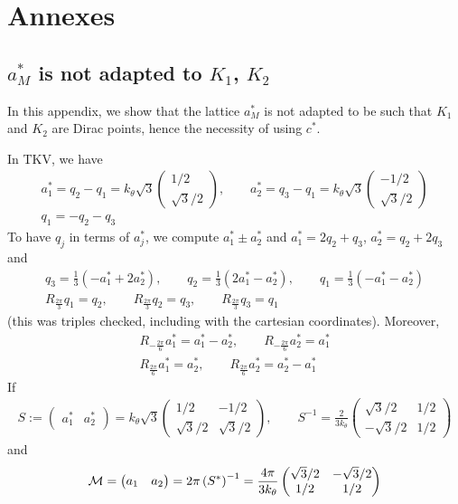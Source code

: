 \documentclass[11pt,a4paper,reqno,french,tikz]{amsart}
\newcommand{\pa}[1]{\left( #1 \right)} %
\newcommand{\f}[2]{\frac{#1}{#2}} %
\newcommand{\mat}[1]{\begin{pmatrix} #1 \end{pmatrix}} %
\begin{document}
\section{Annexes}%
\label{sec:annexes}

\subsection{$a_M^*$ is not adapted to $K_1$, $K_2$}%
\label{sub:_a_m_is_not_adapted_to_k_1_k_2_}

In this appendix, we show that the lattice $a_M^*$ is not adapted to be such that $K_1$ and $K_2$ are Dirac points, hence the necessity of using $c^*$.

In TKV, we have
\begin{multline*}
	a_1^* = q_2 - q_1 = k_\theta \sqrt{3} \mat{1/2 \\ \sqrt{3}/2},\qquad a_2^* = q_3 - q_1 = k_\theta \sqrt{3} \mat{-1/2 \\ \sqrt{3}/2} \\
	q_1 = -q_2 - q_3
\end{multline*}
To have $q_j$ in terms of $a_j^*$, we compute $a_1^* \pm a_2^*$ and $a_1^* = 2q_2 + q_3$, $a_2^* = q_2 + 2 q_3$ and
\begin{align*}
q_3 = \f 13 \pa{-a_1^* + 2 a_2^*},\qquad q_2 = \f 13 \pa{ 2 a_1^* - a_2^*},\qquad q_1 = \f 13 \pa{-a_1^* - a_2^*} \\
R_{\f{2\pi}{3}} q_1 = q_2,\qquad R_{\f{2\pi}{3}} q_2 = q_3,\qquad R_{\f{2\pi}{3}} q_3 = q_1
\end{align*}
(this was triples checked, including with the cartesian coordinates). Moreover,
\begin{multline*}
R_{-\f{2\pi}{6}} a_1^* = a_1^* - a_2^*,\qquad R_{-\f{2\pi}{6}} a_2^* = a_1^* \\
R_{\f{2\pi}{6}} a_1^* = a_2^*,\qquad R_{\f{2\pi}{6}} a_2^* = a_2^* - a_1^*
\end{multline*}
If 
\begin{align*}
	S := \mat{a_1^* & a_2^*} = k_\theta \sqrt{3} \mat{1/2 & -1/2 \\ \sqrt{3}/2 & \sqrt{3}/2}, \qquad S^{-1} = \f{2}{3 k_\theta} \mat{\sqrt{3}/2 & 1/2 \\ -\sqrt{3}/2 & 1/2}
\end{align*}
and
\begin{align*}
\cM = \mat{a_1 & a_2} = 2\pi \pa{S^*}^{-1} = \f{4\pi}{3k_\theta} \mat{\sqrt{3}/2 & - \sqrt{3}/2 \\ 1/2 & 1/2}
\end{align*}
\end{document}
